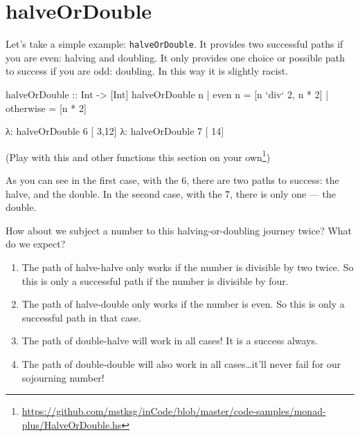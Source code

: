 \documentclass[]{article}
\newenvironment{Shaded}{}{}
\newcommand{\DataTypeTok}[1]{\textcolor[rgb]{0.56,0.13,0.00}{{#1}}}
\newcommand{\DecValTok}[1]{\textcolor[rgb]{0.25,0.63,0.44}{{#1}}}
\newcommand{\OtherTok}[1]{\textcolor[rgb]{0.00,0.44,0.13}{{#1}}}
\newcommand{\FunctionTok}[1]{\textcolor[rgb]{0.02,0.16,0.49}{{#1}}}
\newcommand{\NormalTok}[1]{{#1}}
\renewcommand{\href}[2]{#2\footnote{\url{#1}}}
\begin{document}
\section{halveOrDouble}\label{halveordouble}

Let's take a simple example: \texttt{halveOrDouble}. It provides two successful paths if you are
even: halving and doubling. It only provides one choice or possible path to success if you are odd:
doubling. In this way it is slightly racist.

\begin{Shaded}
\begin{Highlighting}[]
\OtherTok{halveOrDouble ::} \DataTypeTok{Int} \OtherTok{->} \NormalTok{[}\DataTypeTok{Int}\NormalTok{]}
\NormalTok{halveOrDouble n }\FunctionTok{|} \NormalTok{even n    }\FunctionTok{=} \NormalTok{[n }\OtherTok{`div`} \DecValTok{2}\NormalTok{, n }\FunctionTok{*} \DecValTok{2}\NormalTok{]}
                \FunctionTok{|} \NormalTok{otherwise }\FunctionTok{=} \NormalTok{[n }\FunctionTok{*} \DecValTok{2}\NormalTok{]}
\end{Highlighting}
\end{Shaded}

\begin{Shaded}
\begin{Highlighting}[]
\NormalTok{λ}\FunctionTok{:} \NormalTok{halveOrDouble }\DecValTok{6}
\NormalTok{[ }\DecValTok{3}\NormalTok{,}\DecValTok{12}\NormalTok{]}
\NormalTok{λ}\FunctionTok{:} \NormalTok{halveOrDouble }\DecValTok{7}
\NormalTok{[   }\DecValTok{14}\NormalTok{]}
\end{Highlighting}
\end{Shaded}

(\href{https://github.com/mstksg/inCode/blob/master/code-samples/monad-plus/HalveOrDouble.hs}{Play
with this and other functions this section on your own})

As you can see in the first case, with the 6, there are two paths to success: the halve, and the
double. In the second case, with the 7, there is only one --- the double.

How about we subject a number to this halving-or-doubling journey twice? What do we expect?

\begin{enumerate}
\def\labelenumi{\arabic{enumi}.}
\tightlist
\item
  The path of halve-halve only works if the number is divisible by two twice. So this is only a
  successful path if the number is divisible by four.
\item
  The path of halve-double only works if the number is even. So this is only a successful path in
  that case.
\item
  The path of double-halve will work in all cases! It is a success always.
\item
  The path of double-double will also work in all cases\ldots{}it'll never fail for our sojourning
  number!
\end{enumerate}
\end{document}
